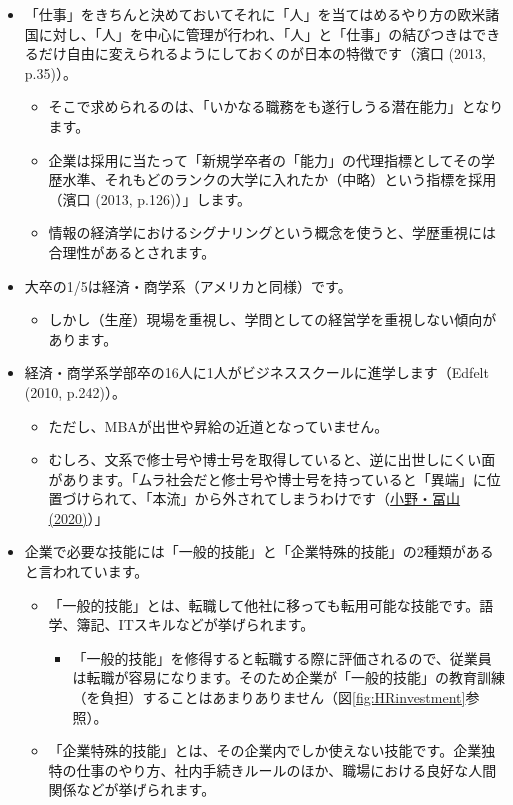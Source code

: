 \documentclass[
]{book}
\providecommand{\tightlist}{%
  \setlength{\itemsep}{0pt}\setlength{\parskip}{0pt}}
\begin{document}
\begin{itemize}
\item
  「仕事」をきちんと決めておいてそれに「人」を当てはめるやり方の欧米諸国に対し、「人」を中心に管理が行われ、「人」と「仕事」の結びつきはできるだけ自由に変えられるようにしておくのが日本の特徴です（濱口 (2013, p.35)）。

  \begin{itemize}
  \item
    そこで求められるのは、「いかなる職務をも遂行しうる潜在能力」となります。
  \item
    企業は採用に当たって「新規学卒者の「能力」の代理指標としてその学歴水準、それもどのランクの大学に入れたか（中略）という指標を採用（濱口 (2013, p.126)）」します。
  \item
    情報の経済学におけるシグナリングという概念を使うと、学歴重視には合理性があるとされます。
  \end{itemize}
\item
  大卒の1/5は経済・商学系（アメリカと同様）です。

  \begin{itemize}
  \tightlist
  \item
    しかし（生産）現場を重視し、学問としての経営学を重視しない傾向があります。
  \end{itemize}
\item
  経済・商学系学部卒の16人に1人がビジネススクールに進学します（Edfelt (2010, p.242)）。

  \begin{itemize}
  \item
    ただし、MBAが出世や昇給の近道となっていません。
  \item
    むしろ、文系で修士号や博士号を取得していると、逆に出世しにくい面があります。「ムラ社会だと修士号や博士号を持っていると「異端」に位置づけられて、「本流」から外されてしまうわけです（\href{https://gendai.ismedia.jp/articles/-/71570?page=5}{小野・冨山 (2020)}）」
  \end{itemize}
\item
  企業で必要な技能には「一般的技能」と「企業特殊的技能」の2種類があると言われています。

  \begin{itemize}
  \item
    「一般的技能」とは、転職して他社に移っても転用可能な技能です。語学、簿記、ITスキルなどが挙げられます。

    \begin{itemize}
    \tightlist
    \item
      「一般的技能」を修得すると転職する際に評価されるので、従業員は転職が容易になります。そのため企業が「一般的技能」の教育訓練（を負担）することはあまりありません（図\ref{fig:HRinvestment}参照）。
    \end{itemize}
  \item
    「企業特殊的技能」とは、その企業内でしか使えない技能です。企業独特の仕事のやり方、社内手続きルールのほか、職場における良好な人間関係などが挙げられます。


\end{itemize}
\end{itemize}
\end{document}

